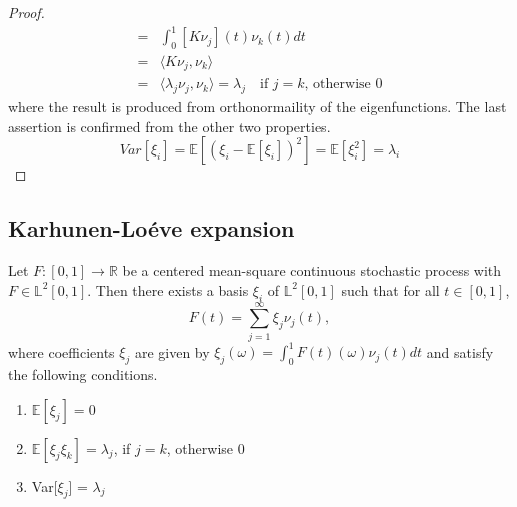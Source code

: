 \documentclass[11pt,twoside,a4paper]{article}
\begin{document}
\begin{proof}
\begin{equation}
\begin{split}
				= & \int_{0}^{1}[K\nu_{j}](t)\nu_{k}(t)dt\\
				= & \langle K \nu_{j}, \nu_{k} \rangle\\
				= & \langle \lambda_{j} \nu_{j}, \nu_{k} \rangle = \lambda_{j} \quad \text{if $j = k$, otherwise 0}
			\end{split}
		\end{equation}
		where the result is produced from orthonormaility of the eigenfunctions. The last assertion is confirmed from the other two properties.
		\begin{equation}\label{Lemma3}
			Var[\xi_{i}] = \mathbb{E}\left[(\xi_{i} - \mathbb{E}[\xi_{i}])^{2}\right] = \mathbb{E}[\xi_{i}^{2}] = \lambda_{i}
		\end{equation}
	\end{proof}
	
	
	\subsection{Karhunen-Lo\'{e}ve expansion} \label{Proof2}
	Let $F : [0,1]  \rightarrow \mathbb{R}$ be a centered mean-square continuous stochastic process with $F \in \mathbb{L}^{2}[0,1]$. Then there exists a basis ${\xi_{i}}$ of $\mathbb{L}^2[0,1]$ such that for all $t \in [0,1]$,
	\begin{equation}
		F(t) = \sum_{j=1}^{\infty} \xi_{j} \nu_{j}(t),
	\end{equation}
	where coefficients $\xi_{j}$ are given by $\xi_{j}(\omega) = \int_{0}^{1} F(t)(\omega) \nu_{j}(t)dt$ and satisfy the following conditions.
	\begin{enumerate}
		\item $\mathbb{E}[\xi_{j}] = 0$
		\item $\mathbb{E}[\xi_{j} \xi_{k}] = \lambda_{j}$, if $j = k$, otherwise 0
		\item Var[$\xi_{j}$] = $\lambda_{j}$
	\end{enumerate}
	
\end{document}
